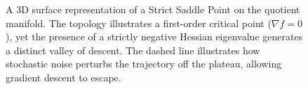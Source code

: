 \vspace{12cm}

\begin{figure}[h!]
    \centering
    \caption{A 3D surface representation of a Strict Saddle Point on the quotient manifold. The topology illustrates a first-order critical point ($\nabla f = 0$), yet the presence of a strictly negative Hessian eigenvalue generates a distinct valley of descent. The dashed line illustrates how stochastic noise perturbs the trajectory off the plateau, allowing gradient descent to escape.}
    \label{fig:strict_saddle_topology}
\end{figure}